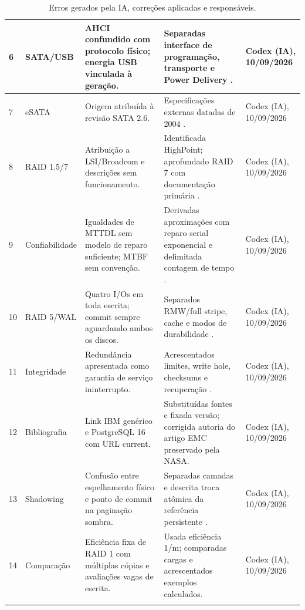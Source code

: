 \documentclass[titlepage]{article}
\begin{document}
\begin{longtable}{|p{}|p{}|p{}|p{}|p{}|}
\hline
6 & SATA/USB & AHCI confundido com protocolo físico; energia USB vinculada à geração. & Separadas interface de programação, transporte e Power Delivery \cite{intel_ahci,usb_pd}. & Codex (IA), 10/09/2026 \\
\hline
7 & eSATA & Origem atribuída à revisão SATA 2.6. & Especificações externas datadas de 2004 \cite{sata_esata}. & Codex (IA), 10/09/2026 \\
\hline
8 & RAID 1.5/7 & Atribuição a LSI/Broadcom e descrições sem funcionamento. & Identificada HighPoint; aprofundado RAID 7 com documentação primária \cite{highpoint_15,storagecomputer_7}. & Codex (IA), 10/09/2026 \\
\hline
9 & Confiabilidade & Igualdades de MTTDL sem modelo de reparo suficiente; MTBF sem convenção. & Derivadas aproximações com reparo serial exponencial e delimitada contagem de tempo \cite{nist_mtbf}. & Codex (IA), 10/09/2026 \\
\hline
10 & RAID 5/WAL & Quatro I/Os em toda escrita; commit sempre aguardando ambos os discos. & Separados RMW/full stripe, cache e modos de durabilidade \cite{raid5_io,postgresql_wal_config}. & Codex (IA), 10/09/2026 \\
\hline
11 & Integridade & Redundância apresentada como garantia de serviço ininterrupto. & Acrescentados limites, write hole, checksums e recuperação \cite{spdk_raid5f,krioukov2008}. & Codex (IA), 10/09/2026 \\
\hline
12 & Bibliografia & Link IBM genérico e PostgreSQL 16 com URL current. & Substituídas fontes e fixada versão; corrigida autoria do artigo EMC preservado pela NASA. & Codex (IA), 10/09/2026 \\
\hline
13 & Shadowing & Confusão entre espelhamento físico e ponto de commit na paginação sombra. & Separadas camadas e descrita troca atômica da referência persistente \cite{dbbook_storage,elmasri2016}. & Codex (IA), 10/09/2026 \\
\hline
14 & Comparação & Eficiência fixa de RAID 1 com múltiplas cópias e avaliações vagas de escrita. & Usada eficiência 1/m; comparadas cargas e acrescentados exemplos calculados. & Codex (IA), 10/09/2026 \\
\hline
\caption{Erros gerados pela IA, correções aplicadas e responsáveis.}
\label{tab:erros_ia} \\
\end{longtable}
\endgroup

\clearpage
{}
{}
\renewcommand{\refname}{Referências bibliográficas}


\end{document}
